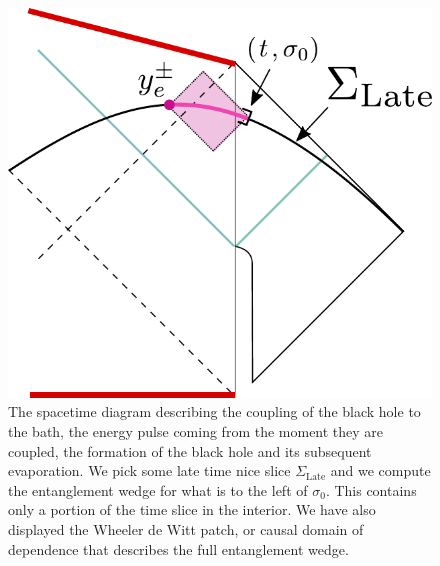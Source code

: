 \documentclass[12pt]{article}
\begin{document}
\begin{figure}[ht]
    \begin{center}
        \includegraphics[scale=.5]{Figures/latetimeslice}
    \end{center}
    \caption{The spacetime diagram describing the coupling of the black hole to the bath, the energy pulse coming from the moment they are coupled, the formation of the black hole and its subsequent evaporation. We pick some late time nice slice $\Sigma_{\text{Late}} $ and we compute the entanglement wedge for what is to the left of $\sigma_0$. This contains only a portion of the time slice in the interior. We have also displayed the Wheeler de Witt patch, or causal domain of dependence that describes the full entanglement wedge.    }
    \label{latetimeslice}
\end{figure}
\end{document}
